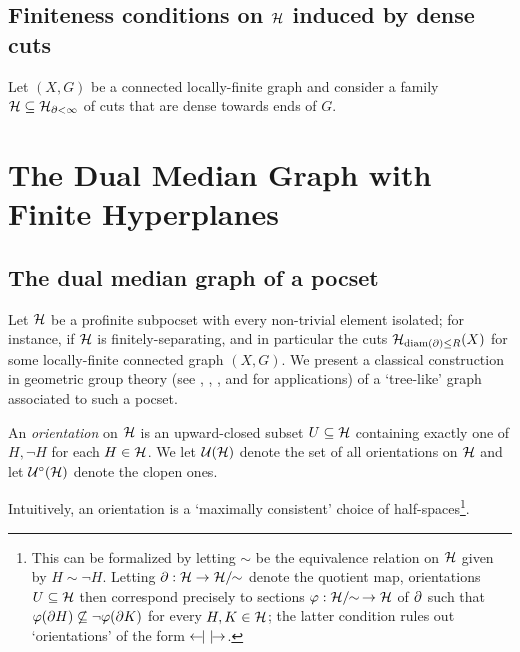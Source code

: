 \documentclass{amsart}
\begin{document}
    \subsection{Finiteness conditions on $\mathcal{H}$ induced by dense cuts}\label{sec:finiteness_conditions_on_pocsets_dense_cuts}

    Let $(X,G)$ be a connected locally-finite graph and consider a family $\mathcal{H}\subseteq\mathcal{H}_{\partial<\infty}$ of cuts that are dense towards ends of $G$. {\color{red}{TODO}}

    \section{The Dual Median Graph with Finite Hyperplanes}

    \subsection{The dual median graph of a pocset}\label{sec:the_dual_median_graph_of_a_pocset}

    Let $\mathcal{H}$ be a profinite subpocset with every non-trivial element isolated; for instance, if $\mathcal{H}$ is finitely-separating, and in particular the cuts $\mathcal{H}_{\operatorname{diam}(\partial)\leq R}(X)$ for some locally-finite connected graph $(X,G)$. We present a classical construction in geometric group theory (see \cite{Dun79}, \cite{Rol98}, \cite{Sag95}, and \cite{NR03} for applications) of a `tree-like' graph associated to such a pocset.
    
    \begin{definition}\label{def:orientation}
        An \textit{orientation} on $\mathcal{H}$ is an upward-closed subset $U\subseteq\mathcal{H}$ containing exactly one of $H,\lnot H$ for each $H\in\mathcal{H}$. We let $\mathcal{U}(\mathcal{H})$ denote the set of all orientations on $\mathcal{H}$ and let $\mathcal{U}^\circ(\mathcal{H})$ denote the clopen ones.
    \end{definition}

    Intuitively, an orientation is a `maximally consistent' choice of half-spaces\footnote{This can be formalized by letting $\sim$ be the equivalence relation on $\mathcal{H}$ given by $H\sim\lnot H$. Letting $\partial:\mathcal{H}\to\mathcal{H}/\!\!\sim$ denote the quotient map, orientations $U\subseteq\mathcal{H}$ then correspond precisely to sections $\varphi:\mathcal{H}/\!\!\sim\,\to\mathcal{H}$ of $\partial$ such that $\varphi(\partial H)\not\subseteq\lnot\varphi(\partial K)$ for every $H,K\in\mathcal{H}$; the latter condition rules out `orientations' of the form $\leftarrow\hspace{-4.15pt}|\,\,|\hspace{-4.15pt}\rightarrow$.}.
\end{document}
